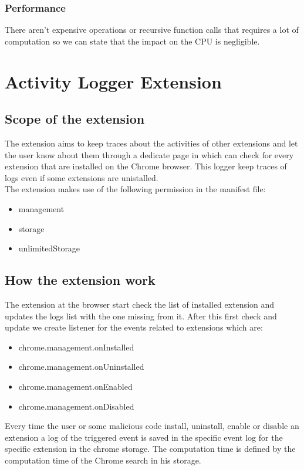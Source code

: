 \documentclass[12pt]{article}
\begin{document}
\begin{multicols}{2}
\subsubsection*{Performance}
There aren't expensive operations or recursive function calls that requires a lot of computation so we can state that the impact on the CPU is negligible.
\section*{Activity Logger Extension}

\subsection*{Scope of the extension}

The extension aims to keep traces about the activities of other extensions and let the user know
about them through a dedicate page in which can check for every extension that are installed on the
Chrome browser. This logger keep traces of logs even if some extensions are unistalled. \\
The extension makes use of the following permission in the manifest file:
{\fontsize{10}{10}\selectfont
	\begin{itemize}
		\item  management
		\item  storage
		\item  unlimitedStorage
	\end{itemize}
}
\subsection*{How the extension work}
The extension at the browser start check the list of installed extension and updates the logs list with the one missing from it.
After this first check and update we create listener for the events related to extensions which are: 
{\fontsize{10}{10}\selectfont
	\begin{itemize}
		\item  chrome.management.onInstalled
		\item  chrome.management.onUninstalled
		\item  chrome.management.onEnabled
		\item  chrome.management.onDisabled
	\end{itemize}
}
Every time the user or some malicious code install, uninstall, enable or disable an extension a log of the triggered event is saved in the specific event log for the specific extension in the chrome storage.
The computation time is defined by the computation time of the Chrome search in his storage.

\end{multicols}
\end{document}
